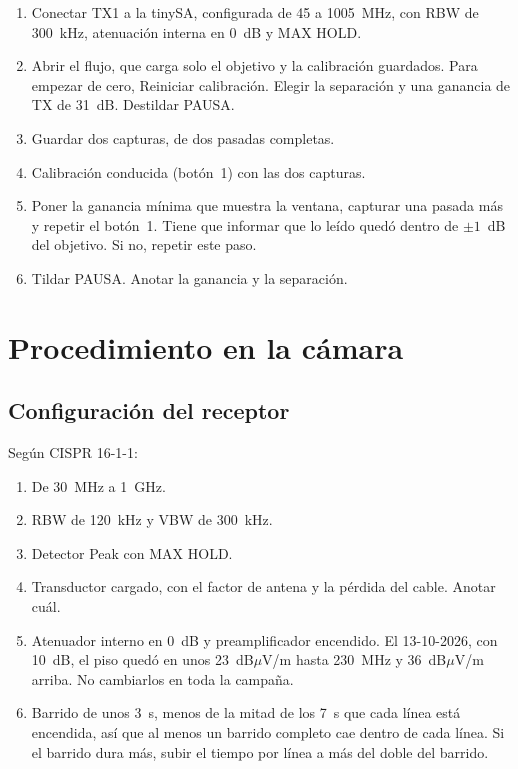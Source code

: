 \documentclass[11pt,a4paper]{article}
\begin{document}
\begin{enumerate}
  \item Conectar TX1 a la tinySA, configurada de 45 a 1005~MHz, con RBW de 300~kHz, atenuación interna en 0~dB y MAX HOLD.
  \item Abrir el flujo, que carga solo el objetivo y la calibración guardados. Para empezar de cero, Reiniciar calibración. Elegir la separación y una ganancia de TX de 31~dB. Destildar PAUSA.
  \item Guardar dos capturas, de dos pasadas completas.
  \item Calibración conducida (botón~1) con las dos capturas.
  \item Poner la ganancia mínima que muestra la ventana, capturar una pasada más y repetir el botón~1. Tiene que informar que lo leído quedó dentro de $\pm 1$~dB del objetivo. Si no, repetir este paso.
  \item Tildar PAUSA. Anotar la ganancia y la separación.
\end{enumerate}

\section{Procedimiento en la cámara}\label{sec:pasos}

\subsection{Configuración del receptor}\label{sec:receptor}

Según CISPR 16-1-1:

\begin{enumerate}
  \item De 30~MHz a 1~GHz.
  \item RBW de 120~kHz y VBW de 300~kHz.
  \item Detector Peak con MAX HOLD.
  \item Transductor cargado, con el factor de antena y la pérdida del cable. Anotar cuál.
  \item Atenuador interno en 0~dB y preamplificador encendido. El 13-10-2026, con 10~dB, el piso quedó en unos 23~dB$\mu$V/m hasta 230~MHz y 36~dB$\mu$V/m arriba. No cambiarlos en toda la campaña.
  \item Barrido de unos 3~s, menos de la mitad de los 7~s que cada línea está encendida, así que al menos un barrido completo cae dentro de cada línea. Si el barrido dura más, subir el tiempo por línea a más del doble del barrido.
\end{enumerate}
\end{document}
